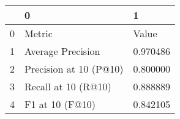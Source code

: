 \begin{tabular}{lll}
\toprule
 & 0 & 1 \\
\midrule
0 & Metric & Value \\
1 & Average Precision & 0.970486 \\
2 & Precision at 10 (P@10) & 0.800000 \\
3 & Recall at 10 (R@10) & 0.888889 \\
4 & F1 at 10 (F@10) & 0.842105 \\
\bottomrule
\end{tabular}

